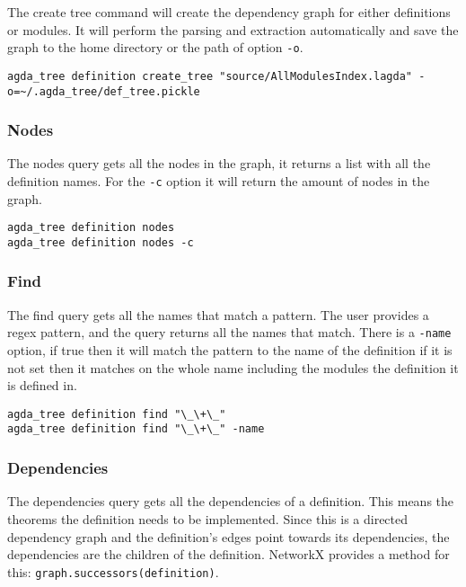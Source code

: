 The create tree command will create the dependency graph for either definitions
or modules. It will perform the parsing and extraction automatically and save
the graph to the home directory or the path of option \texttt{-o}.

\begin{lstlisting}
agda_tree definition create_tree "source/AllModulesIndex.lagda" -o=~/.agda_tree/def_tree.pickle
\end{lstlisting}

\subsubsection{Nodes}

The nodes query gets all the nodes in the graph, it returns a list with all the
definition names. For the \texttt{-c} option it will return the amount of nodes
in the graph. 

\begin{lstlisting}
agda_tree definition nodes
agda_tree definition nodes -c
\end{lstlisting}

\subsubsection{Find}

The find query gets all the names that match a pattern. The user provides a
regex pattern, and the query returns all the names that match.
There is a \texttt{-name} option, if true then it will match the pattern to the name of
the definition if it is not set then it matches on the whole name including the
modules the definition it is defined in.

\begin{lstlisting}
agda_tree definition find "\_\+\_"
agda_tree definition find "\_\+\_" -name
\end{lstlisting}

\subsubsection{Dependencies}

The dependencies query gets all the dependencies of a definition. This means
the theorems the definition needs to be implemented. Since this is a directed
dependency graph and the definition's edges point towards its dependencies, the
dependencies are the children of the definition. NetworkX provides a method for
this: \linebreak \texttt{graph.successors(definition)}.


